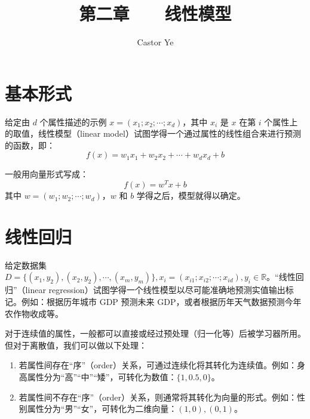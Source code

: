 \documentclass[12pt, a4paper]{article} %
\title{第二章 \ \ \ 线性模型} %
\author{Castor Ye} %
\date{} %
\begin{document}
\maketitle %
\newtheorem{definition}{定义}[section]
\newtheorem{theorem}{定理}[section]
\newtheorem{example}{例}[section]
\newtheorem{solution}{题解}
\newtheorem{algorithm}{算法}
\newtheorem{axiom}{公理}
\newtheorem{property}{性质}
\newtheorem{proposition}{命题}
\newtheorem{lemma}{引理}
\newtheorem{corollary}{推论}[section]
\newtheorem{remark}{注解}
\newtheorem{condition}{条件}
\newtheorem{conclusion}{结论}
\newtheorem{assumption}{假设}
\renewcommand{\figurename}{图} %
\renewcommand{\tablename}{表} %
\section{基本形式}

给定由 $d$ 个属性描述的示例 $x = (x_1; x_2; \cdots; x_d)$，其中 $x_i$ 是 $x$ 在第 $i$ 个属性上的取值，线性模型（linear model）试图学得一个通过属性的线性组合来进行预测的函数，即：
\begin{equation*}
    f(x) = w_1x_1 + w_2x_2 + \cdots + w_dx_d + b
\end{equation*}

一般用向量形式写成：
\begin{equation*}
    f(x) = w^T x + b
\end{equation*}
其中 $w = (w_1; w_2; \cdots ; w_d)$，$w$ 和 $b$ 学得之后，模型就得以确定。

\section{线性回归}

给定数据集 $D = \{(x_1, y_2), (x_2, y_2), \cdots, (x_m, y_m)\}, x_i = (x_{i1}; x_{i2}; \cdots; x_{id}), y_i \in \mathbb{R}$。“线性回归”（linear regression）试图学得一个线性模型以尽可能准确地预测实值输出标记。例如：根据历年城市 GDP 预测未来 GDP，或者根据历年天气数据预测今年农作物收成等。

对于连续值的属性，一般都可以直接或经过预处理（归一化等）后被学习器所用。但对于离散值，我们可以做以下处理：

\begin{enumerate}[\hspace*{2em} i.]
    \item 若属性间存在“序”（order）关系，可通过连续化将其转化为连续值。例如：身高属性分为“高”“中”“矮”，可转化为数值：$\{1, 0.5, 0\}$。
    \item 若属性间不存在“序”（order）关系，则通常将其转化为向量的形式。例如：性别属性分为“男”“女”，可转化为二维向量：${(1, 0), (0, 1)}$。
\end{enumerate}
\end{document}
